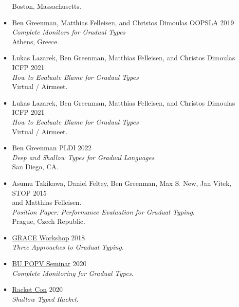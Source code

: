 \documentclass{article}
\begin{document}
\begin{itemize}
  Boston, Massachusetts.
\item
  Ben Greenman, Matthias Felleisen, and Christos Dimoulas \hfill OOPSLA 2019 \\
  \emph{Complete Monitors for Gradual Types} \\
  Athens, Greece.
\item
  Lukas Lazarek, Ben Greenman, Matthias Felleisen, and Christos Dimoulas \hfill ICFP 2021 \\
  \emph{How to Evaluate Blame for Gradual Types} \\
  Virtual / Airmeet.
\item
  Lukas Lazarek, Ben Greenman, Matthias Felleisen, and Christos Dimoulas \hfill ICFP 2021 \\
  \emph{How to Evaluate Blame for Gradual Types} \\
  Virtual / Airmeet.
\item
  Ben Greenman \hfill PLDI 2022 \\
  \emph{Deep and Shallow Types for Gradual Languages} \\
  San Diego, CA.
\end{itemize}

\begin{itemize}
\item
  Asumu Takikawa, Daniel Feltey, Ben Greenman, Max S. New, Jan Vitek, \hfill STOP 2015 \\
   and Matthias Felleisen. \\
   \emph{Position Paper: Performance Evaluation for Gradual Typing}. \\
  Prague, Czech Republic.
\end{itemize}


\begin{itemize}
  \item
    \href{https://2018.splashcon.org/track/grace-2018-papers}{GRACE Workshop} \hfill 2018\\
    \emph{Three Approaches to Gradual Typing}.
  \item
    \href{https://www.bu.edu/cs/research/popv/seminar/}{BU POPV Seminar} \hfill {2020}\\
    \emph{Complete Monitoring for Gradual Types}.
  \item
    \href{https://con.racket-lang.org/2020}{Racket Con} \hfill 2020\\
    \emph{Shallow Typed Racket}.
\end{itemize}


\end{document}
